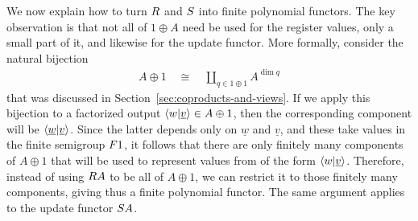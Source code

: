 We now explain how to turn $\functorr$ and $\functors$ into finite polynomial functors. The key observation is  that not all of $1 \oplus A$ need be used for the register values, only a small part of it, and likewise for the update functor. More formally, 
consider the natural bijection
\begin{align*}
A \oplus 1  \quad \cong \quad 
\coprod_{q \in 1 \oplus 1}  A^{\dim q}
\end{align*}
that was discussed in Section~\ref{sec:coproducts-and-views}. If we apply this bijection to a factorized output $
\langle w|\underline {v} \rangle \in A \oplus 1$, 
then the corresponding component will be $\langle \underline w | \underline v \rangle$. Since the latter depends only  on $\underline w$ and $\underline v$, and these take values in the finite semigroup $\functor 1$, it follows that there are only finitely many components of $A \oplus 1$ that will be used to represent values from of the form $\langle w | \underline v \rangle$. Therefore, instead of using $\functorr A$ to be all of $A \oplus 1$, we can restrict it to those finitely many components, giving thus a finite polynomial functor. The same argument applies to the update functor $\functors A$.